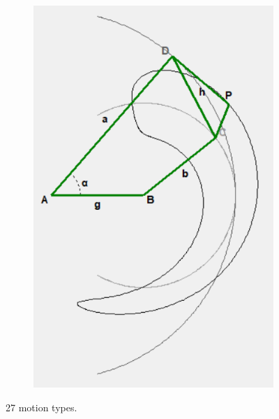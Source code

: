 \documentclass{article}
\begin{document}
\begin{figure}[h]
\begin{subfigure}{0.19\textwidth}
		\caption{}
	\end{subfigure}
	\hfill
	\begin{subfigure}{0.19\textwidth}
		\centering
		\includegraphics[width=\linewidth, height=0.95\linewidth, keepaspectratio]{./Figures/27_motion_cases/-1-1-1.png}
		\caption{}
	\end{subfigure}
	\caption{27 motion types.}
	\label{fig:27_motion_types}
\end{figure}
\end{document}
